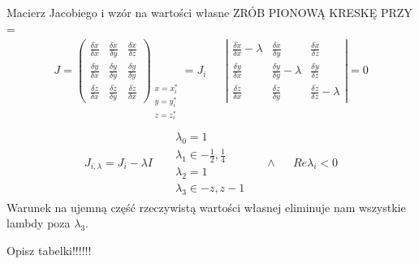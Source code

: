 Macierz Jacobiego i wzór na wartości własne{\color{red} ZRÓB PIONOWĄ KRESKĘ PRZY =}
\begin{align*}
J= \left(
\begin{array}{ccc}
\frac{\delta \dot{x}}{\delta x} & \frac{\delta \dot{x}}{\delta y} & \frac{\delta \dot{x}}{\delta z} \\
\frac{\delta \dot{y}}{\delta x} & \frac{\delta \dot{y}}{\delta y} & \frac{\delta \dot{y}}{\delta y} \\
\frac{\delta \dot{z}}{\delta x} & \frac{\delta \dot{z}}{\delta y} & \frac{\delta \dot{z}}{\delta x}
\end{array}
\right)_{
	\begin{array}{c}
		x=x^*_i\\
		y=y^*_i\\
		z=z^*_i\\	
	\end{array}	
} = J_i
&&
\left|
\begin{array}{ccc}
\frac{\delta \dot{x}}{\delta x}-\lambda & \frac{\delta \dot{x}}{\delta y} & \frac{\delta \dot{x}}{\delta z} \\
\frac{\delta \dot{y}}{\delta x} & \frac{\delta \dot{y}}{\delta y}-\lambda & \frac{\delta \dot{y}}{\delta z} \\
\frac{\delta \dot{z}}{\delta x} & \frac{\delta \dot{z}}{\delta y} & \frac{\delta \dot{z}}{\delta z}-\lambda
\end{array}
\right| = 0
\end{align*}
\begin{align*}
J_{i,\lambda} = J_i - \lambda I && 
\begin{array}{l}
\lambda_0 = 1\\
\lambda_1 \in {-\frac{1}{2}, \frac{1}{4}}\\
\lambda_2 = 1\\
\lambda_3 \in {-z, z-1}
\end{array}
&& \wedge &&
Re \lambda_i < 0
\end{align*}
Warunek na ujemną część rzeczywistą wartości własnej eliminuje nam wszystkie lambdy poza $\lambda_3$.

Opisz tabelki!!!!!!
















